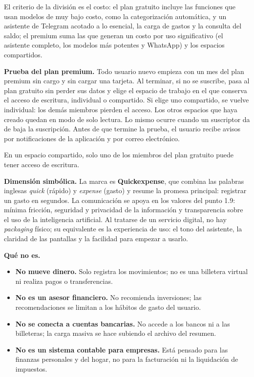 El criterio de la división es el costo: el plan gratuito incluye las
funciones que usan modelos de muy bajo costo, como la categorización
automática, y un asistente de Telegram acotado a lo esencial, la carga
de gastos y la consulta del saldo; el premium suma las que generan un
costo por uso significativo (el asistente completo, los modelos más
potentes y WhatsApp) y los espacios compartidos.

\textbf{Prueba del plan premium.} Todo usuario nuevo empieza con un mes
del plan premium sin cargo y sin cargar una tarjeta. Al terminar, si no
se suscribe, pasa al plan gratuito sin perder sus datos y elige el
espacio de trabajo en el que conserva el acceso de escritura, individual
o compartido. Si elige uno compartido, se vuelve individual: los demás
miembros pierden el acceso. Los otros espacios que haya creado quedan en
modo de solo lectura. Lo mismo ocurre cuando un suscriptor da de baja la
suscripción. Antes de que termine la prueba, el usuario recibe avisos
por notificaciones de la aplicación y por correo electrónico.

En un espacio compartido, solo uno de los miembros del plan gratuito
puede tener acceso de escritura.

\textbf{Dimensión simbólica.} La marca es \textbf{Quickexpense}, que
combina las palabras inglesas \emph{quick} (rápido) y \emph{expense}
(gasto) y resume la promesa principal: registrar un gasto en segundos.
La comunicación se apoya en los valores del punto 1.9: mínima fricción,
seguridad y privacidad de la información y transparencia sobre el uso de
la inteligencia artificial. Al tratarse de un servicio digital, no hay
\emph{packaging} físico; su equivalente es la experiencia de uso: el
tono del asistente, la claridad de las pantallas y la facilidad para
empezar a usarlo.

\textbf{Qué no es.}

\begin{itemize}
\tightlist
\item
  \textbf{No mueve dinero.} Solo registra los movimientos; no es una
  billetera virtual ni realiza pagos o transferencias.
\item
  \textbf{No es un asesor financiero.} No recomienda inversiones; las
  recomendaciones se limitan a los hábitos de gasto del usuario.
\item
  \textbf{No se conecta a cuentas bancarias.} No accede a los bancos ni
  a las billeteras; la carga masiva se hace subiendo el archivo del
  resumen.
\item
  \textbf{No es un sistema contable para empresas.} Está pensado para
  las finanzas personales y del hogar, no para la facturación ni la
  liquidación de impuestos.
\end{itemize}

